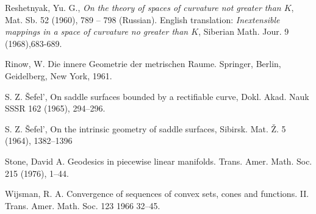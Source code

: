 \begin{thebibliography}{52}
Reshetnyak, Yu. G.,
\textit{On the theory of spaces of curvature not greater than $K$},
 Mat. Sb. 52 (1960), 789 -- 798 (Russian).
English translation: \textit{Inextensible mappings in a space of curvature
no greater than $K$}, Siberian Math. Jour. 9 (1968),683-689.

Rinow, W. Die innere Geometrie der metrischen Raume. Springer, Berlin, Geidelberg, New York, 1961.

 S. Z. \v{S}efel', On saddle surfaces bounded by a rectifiable curve, Dokl. Akad. Nauk SSSR 162 (1965), 294--296.

 S. Z. \v{S}efel', On the intrinsic geometry of saddle surfaces, Sibirsk. Mat. \v{Z}. 5 (1964), 1382--1396

Stone, David A.
Geodesics in piecewise linear manifolds.
Trans. Amer. Math. Soc. 215 (1976), 1--44.

 Wijsman, R. A. Convergence of sequences of convex sets, cones and functions. II. Trans. Amer. Math. Soc. 123 1966 32--45.


\end{thebibliography}
